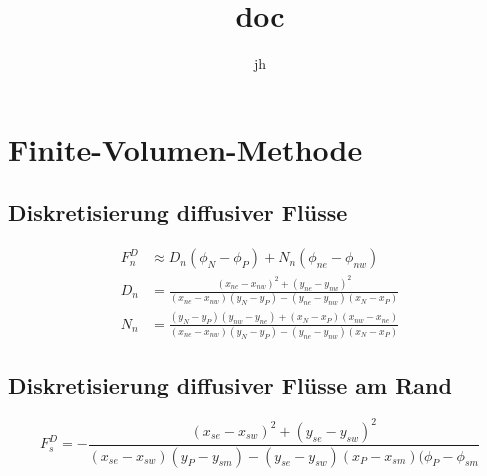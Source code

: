 \documentclass[10pt,a4paper]{article}
\title{doc}
\author{jh}
\begin{document}
\section{Finite-Volumen-Methode}
\subsection{Diskretisierung diffusiver Flüsse}

\begin{align}
F_n^D &\approx D_n ( \phi_N-\phi_P )+N_n(\phi_{ne} - \phi_{nw}) \\
D_n &= \frac{(x_{ne}-x_{nw})^2 +(y_{ne}-y_{nw})^2}{(x_{ne}-x_{nw})(y_N-y_P)-(y_{ne}-y_{nw})(x_N-x_P)} \\
N_n &= \frac{(y_N-y_P)(y_{nw}-y_{ne})+(x_N-x_P)(x_{nw}-x_{ne})}{(x_{ne}-x_{nw})(y_N-y_P)-(y_{ne}-y_{nw})(x_N-x_P)}
\end{align}
\subsection{Diskretisierung diffusiver Flüsse am Rand}
\begin{equation}
F_s^D = - \frac{(x_{se}-x_{sw})^2+(y_{se}-y_{sw})^2}{(x_{se}-x_{sw})(y_P-y_{sm})-(y_{se}-y_{sw})(x_P-x_{sm})(\phi_P-\phi_{sm}}
\end{equation}
\end{document}
